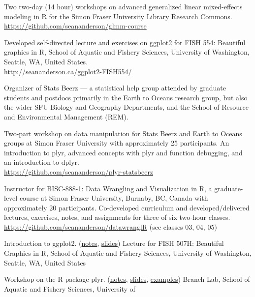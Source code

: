 \begin{description}
\tightlist
\item[2016]
Two two-day (14 hour) workshops on advanced generalized linear
mixed-effects modeling in R for the Simon Fraser University Library
Research Commons. \url{https://github.com/seananderson/glmm-course}
\item[2014--16]
Developed self-directed lecture and exercises on ggplot2 for FISH 554:
Beautiful graphics in R, School of Aquatic and Fishery Sciences,
University of Washington, Seattle, WA, United States.\\
\url{http://seananderson.ca/ggplot2-FISH554/}
\item[2013--14]
Organizer of Stats Beerz --- a statistical help group attended by
graduate students and postdocs primarily in the Earth to Oceans research
group, but also the wider SFU Biology and Geography Departments, and the
School of Resource and Environmental Management (REM).
\item[2013]
Two-part workshop on data manipulation for Stats Beerz and Earth to
Oceans groups at Simon Fraser University with approximately 25
participants. An introduction to plyr, advanced concepts with plyr and
function debugging, and an introduction to dplyr.\\
\url{https://github.com/seananderson/plyr-statsbeerz}
\item[2013]
Instructor for BISC-888-1: Data Wrangling and Visualization in R, a
graduate-level course at Simon Fraser University, Burnaby, BC, Canada
with approximately 20 participants. Co-developed curriculum and
developed/delivered lectures, exercises, notes, and assignments for
three of six two-hour classes.\\
\url{https://github.com/seananderson/datawranglR} (see classes 03, 04,
05)
\item[2012]
Introduction to ggplot2.
(\href{http://seananderson.ca/courses/12-ggplot2/ggplot2_notes.pdf}{notes},
\href{http://seananderson.ca/courses/12-ggplot2/ggplot2_slides_with_examples.pdf}{slides})
Lecture for FISH 507H: Beautiful Graphics in R, School of Aquatic and
Fishery Sciences, University of Washington, Seattle, WA, United States
\item[2012]
Workshop on the R package plyr.
(\href{http://seananderson.ca/courses/12-plyr/plyr_2012.pdf}{notes},
\href{http://seananderson.ca/courses/12-plyr/plyr_2012_slides.pdf}{slides},
\href{http://seananderson.ca/courses/12-plyr/plyr_2012_examples.html}{examples})
Branch Lab, School of Aquatic and Fishery Sciences, University of

\end{description}
